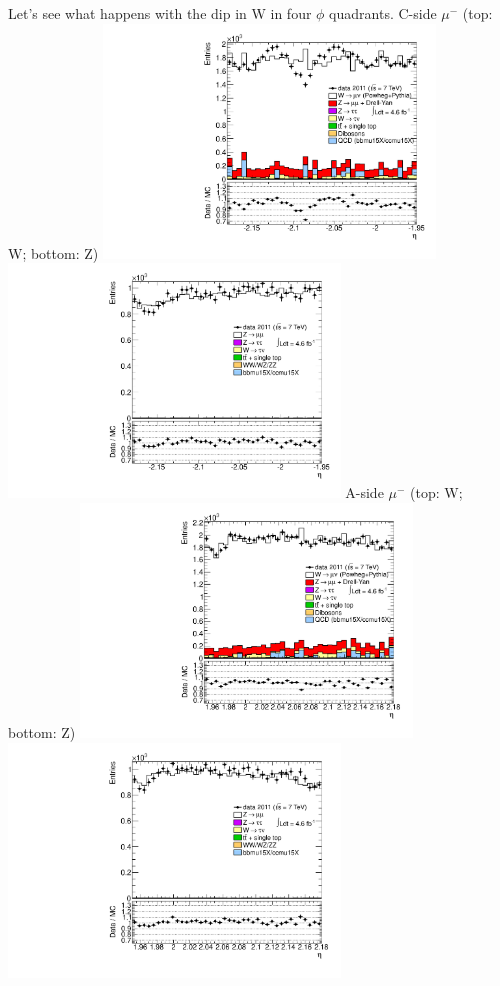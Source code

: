  {
Let's see what happens with the dip in W in four $\phi$ quadrants.
}
 {
\colb[T]
C-side $\mu^{-}$ (top: W; bottom: Z)
\centering
\includegraphics[width=0.66\textwidth]{dates/20130306/figures/both/WlQ1_10_C_stack_l_eta_NEG} \\
\includegraphics[width=0.66\textwidth]{dates/20130306/figures/both/Z_10_C_stack_lN_eta_ALL.pdf}
A-side $\mu^{-}$ (top: W; bottom: Z)
\centering
\includegraphics[width=0.66\textwidth]{dates/20130306/figures/both/WlQ1_10_A_stack_l_eta_NEG} \\
\includegraphics[width=0.66\textwidth]{dates/20130306/figures/both/Z_10_A_stack_lN_eta_ALL.pdf} 
\cole
} %

